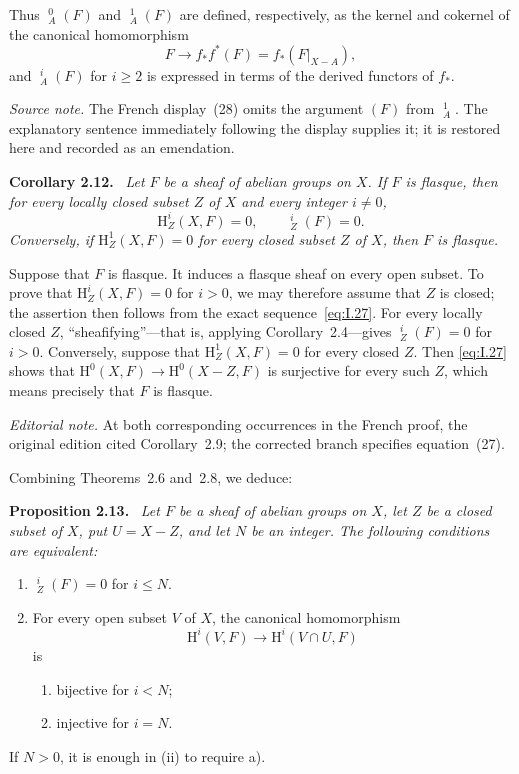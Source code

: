 \documentclass[11pt]{article}
\newcommand{\uH}{\mathop{\underline{\mathrm H}}\nolimits}
\newcommand{\restr}[2]{#1\vert_{#2}}
\newcommand{\srcpage}[1]{%
  \marginpar{\raggedright\scriptsize\color{rulegray}French printed p.~#1}}
\newenvironment{sgastatement}[1]
  {\par\addvspace{0.8\baselineskip}\noindent\textbf{#1.}\ \itshape}
  {\par\addvspace{0.4\baselineskip}}
\begin{document}
Thus $\uH_A^0(F)$ and $\uH_A^1(F)$ are defined, respectively, as the kernel
and cokernel of the canonical homomorphism
\[
  F\longrightarrow f_*f^*(F)=f_*(\restr{F}{X-A}),
\]
and $\uH_A^i(F)$ for $i\ge2$ is expressed in terms of the derived functors
of $f_*$.

\noindent\textit{Source note.} The French display~(28) omits the argument
$(F)$ from $\uH_A^1$. The explanatory sentence immediately following the
display supplies it; it is restored here and recorded as an emendation.

\begin{sgastatement}{Corollary 2.12}
Let $F$\srcpage{17} be a sheaf of abelian groups on $X$. If $F$ is flasque,
then for every locally closed subset $Z$ of $X$ and every integer $i\ne0$,
\[
  \mathrm H_Z^i(X,F)=0,
  \qquad
  \uH_Z^i(F)=0.
\]
Conversely, if $\mathrm H_Z^1(X,F)=0$ for every closed subset $Z$ of $X$,
then $F$ is flasque.
\end{sgastatement}

Suppose that $F$ is flasque. It induces a flasque sheaf on every open
subset. To prove that $\mathrm H_Z^i(X,F)=0$ for $i>0$, we may therefore
assume that $Z$ is closed; the assertion then follows from the exact
sequence~\eqref{eq:I.27}. For every locally closed $Z$, ``sheafifying''---that
is, applying Corollary~2.4---gives $\uH_Z^i(F)=0$ for $i>0$. Conversely,
suppose that $\mathrm H_Z^1(X,F)=0$ for every closed $Z$. Then
\eqref{eq:I.27} shows that
$\mathrm H^0(X,F)\to\mathrm H^0(X-Z,F)$ is surjective for every such $Z$,
which means precisely that $F$ is flasque.

\noindent\textit{Editorial note.} At both corresponding occurrences in the
French proof, the original edition cited Corollary~2.9; the corrected branch
specifies equation~(27).

Combining Theorems~2.6 and~2.8, we deduce:

\begin{sgastatement}{Proposition 2.13}
Let $F$ be a sheaf of abelian groups on $X$, let $Z$ be a closed subset of
$X$, put $U=X-Z$, and let $N$ be an integer. The following conditions are
equivalent:
\begin{enumerate}[label=\textup{(\roman*)},leftmargin=2.7em]
  \item $\uH_Z^i(F)=0$ for $i\le N$.
  \item For every open subset $V$ of $X$, the canonical homomorphism
  \[
    \mathrm H^i(V,F)\longrightarrow\mathrm H^i(V\cap U,F)
  \]
  is
  \begin{enumerate}[label=\textup{\alph*)},leftmargin=2.5em]
    \item bijective for $i<N$;
    \item injective for $i=N$.
  \end{enumerate}
\end{enumerate}
If $N>0$, it is enough in \textup{(ii)} to require \textup{a)}.
\end{sgastatement}
\end{document}
